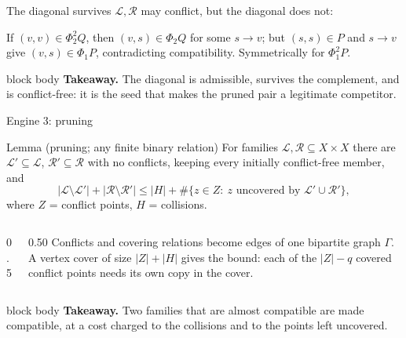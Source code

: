 \documentclass[aspectratio=169,11pt]{beamer}
\newcommand{\abs}[1]{\lvert #1\rvert}
\newcommand{\takeaway}[1]{%
  \vfill
  \begin{beamercolorbox}[wd=\dimexpr\textwidth-9pt\relax,sep=4pt,rounded=true]{block body}
    \footnotesize\color{mainblue}\textbf{Takeaway.} \color{black}#1
  \end{beamercolorbox}}
\begin{document}
\begin{frame}{The diagonal survives}
  \small
  $\mathcal L,\mathcal R$ may conflict, but the diagonal does not:
  \medskip
  \centering
  \scalebox{0.8}{}
  \medskip

  If $(v,v)\in\Phi_2^2Q$, then $(v,s)\in\Phi_2Q$ for some $s\to v$; but $(s,s)\in P$ and $s\to v$
  give $(v,s)\in\Phi_1P$, contradicting compatibility. Symmetrically for $\Phi_1^2P$.
  \takeaway{The diagonal is admissible, survives the complement, and is conflict-free: it is the
  seed that makes the pruned pair a legitimate competitor.}
\end{frame}

\begin{frame}{Engine 3: pruning}
  \begin{block}{Lemma (pruning; any finite binary relation)}
    For families $\mathcal L,\mathcal R\subseteq X\times X$ there are
    $\mathcal L'\subseteq\mathcal L$, $\mathcal R'\subseteq\mathcal R$ with no conflicts, keeping
    every initially conflict-free member, and
    \[
      \abs{\mathcal L\setminus\mathcal L'}+\abs{\mathcal R\setminus\mathcal R'}
      \le\abs H+\#\{z\in Z:\ z\text{ uncovered by }\mathcal L'\cup\mathcal R'\},
    \]
    where $Z$ = conflict points, $H$ = collisions.
  \end{block}
  \small
  \medskip
  \begin{columns}
  \begin{column}{0.5\textwidth}
    \centering
    \scalebox{0.72}{}
  \end{column}
  \begin{column}{0.50\textwidth}
    \footnotesize
    Conflicts and covering relations become edges of one bipartite graph $\Gamma$.
    A vertex cover of size $\abs Z+\abs H$ gives the bound:
    each of the $\abs Z-q$ covered conflict points needs its own copy in the cover.
  \end{column}
  \end{columns}
  \takeaway{Two families that are almost compatible are made compatible, at a cost charged to the
  collisions and to the points left uncovered.}
\end{frame}
\end{document}
